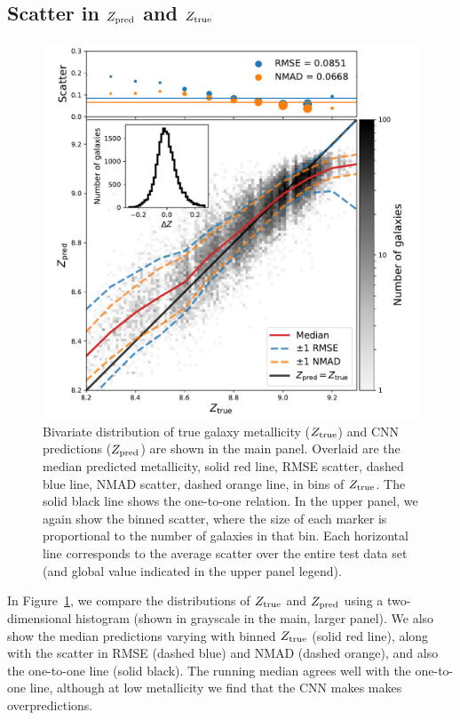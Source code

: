 \documentclass[fleqn,usenatbib]{mnras}
\begin{document}
\subsection{Scatter in $Z_{\rm pred}$ and $Z_{\rm true}$}
\begin{figure}
	\includegraphics[width=\columnwidth]{02-prediction_summary.pdf}
	\caption{\label{fig:predicting-metallicity}
		Bivariate distribution of true galaxy metallicity ($Z_{\rm true}$) and CNN predictions ($Z_{\rm pred}$) are shown in the main panel. Overlaid are the median predicted metallicity, solid red line, RMSE scatter, dashed blue line, NMAD scatter, dashed orange line, in bins of $Z_{\rm true}$. The solid black line shows the one-to-one relation. In the upper panel, we again show the binned scatter, where the size of each marker is proportional to the number of galaxies in that bin. Each horizontal line corresponds to the average scatter over the entire test data set (and global value indicated in the upper panel legend).}
\end{figure}

In Figure~\ref{fig:predicting-metallicity}, we compare the distributions of $Z_{\rm true}$ and $Z_{\rm pred}$ using a two-dimensional histogram (shown in grayscale in the main, larger panel). We also show the median predictions varying with binned $Z_{\rm true}$ (solid red line), along with the scatter in RMSE (dashed blue) and NMAD (dashed orange), and also the one-to-one line (solid black). The running median agrees well with the one-to-one line, although at low metallicity we find that the CNN makes makes overpredictions.
\end{document}
